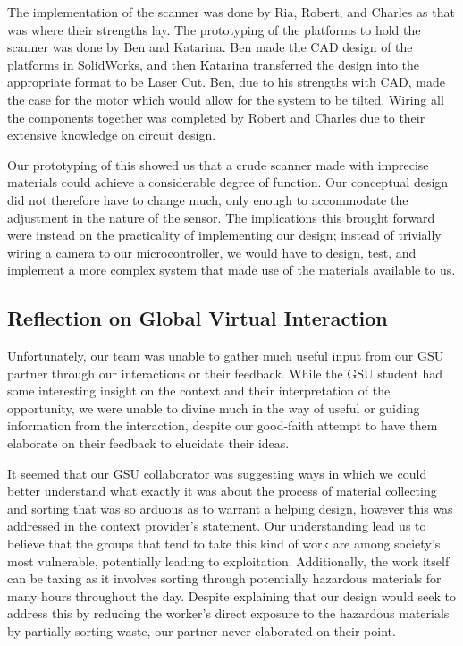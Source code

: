 \documentclass[12pt]{article}
\begin{document}
\begin{multicols*}{2}
        The implementation of the scanner was done by Ria, Robert, and Charles as that was where their strengths lay. The prototyping of the platforms to hold the scanner was done by Ben and Katarina. Ben made the CAD design of the platforms in SolidWorks, and then Katarina transferred the design into the appropriate format to be Laser Cut. Ben, due to his strengths with CAD, made the case for the motor which would allow for the system to be tilted. Wiring all the components together was completed by Robert and Charles due to their extensive knowledge on circuit design. 

        Our prototyping of this showed us that a crude scanner made with imprecise materials could achieve a considerable degree of function. Our conceptual design did not therefore have to change much, only enough to accommodate the adjustment in the nature of the sensor. The implications this brought forward were instead on the practicality of implementing our design; instead of trivially wiring a camera to our microcontroller, we would have to design, test, and implement a more complex system that made use of the materials available to us.
            
        \subsection{Reflection on Global Virtual Interaction}
            Unfortunately, our team was unable to gather much useful input from our GSU partner through our interactions or their feedback. While the GSU student had some interesting insight on the context and their interpretation of the opportunity, we were unable to divine much in the way of useful or guiding information from the interaction, despite our good-faith attempt to have them elaborate on their feedback to elucidate their ideas. 

            It seemed that our GSU collaborator was suggesting ways in which we could better understand what exactly it was about the process of material collecting and sorting that was so arduous as to warrant a helping design, however this was addressed in the context provider's statement. Our understanding lead us to believe that the groups that tend to take this kind of work are among society's most vulnerable, potentially leading to exploitation. Additionally, the work itself can be taxing as it involves sorting through potentially hazardous materials for many hours throughout the day. Despite explaining that our design would seek to address this by reducing the worker's direct exposure to the hazardous materials by partially sorting waste, our partner never elaborated on their point. 
            

\end{multicols*}
\end{document}

